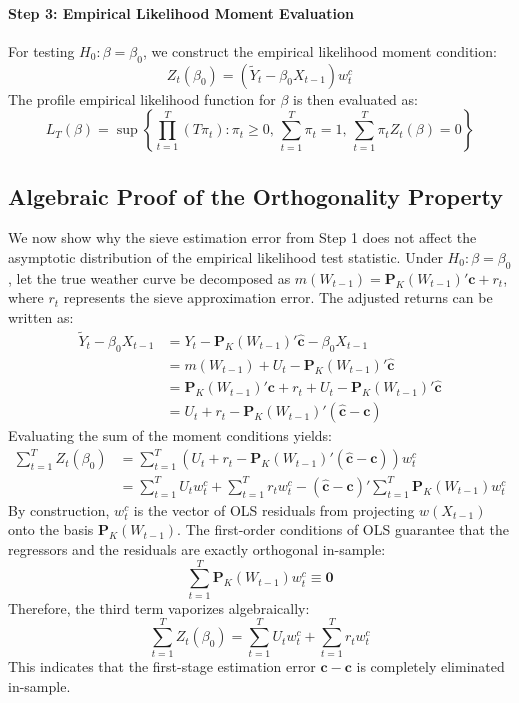 \documentclass{article}
\begin{document}
\paragraph{Step 3: Empirical Likelihood Moment Evaluation}
For testing $H_0: \beta = \beta_0$, we construct the empirical likelihood moment condition:
\begin{equation}
    Z_t(\beta_0) = \left( \widetilde{Y}_t - \beta_0 X_{t-1} \right) w^c_t
\end{equation}
The profile empirical likelihood function for $\beta$ is then evaluated as:
\begin{equation}
    L_T(\beta) = \sup \left\{ \prod_{t=1}^T (T \pi_t) : \pi_t \ge 0, \, \sum_{t=1}^T \pi_t = 1, \, \sum_{t=1}^T \pi_t Z_t(\beta) = 0 \right\}
\end{equation}

\subsection{Algebraic Proof of the Orthogonality Property}

We now show why the sieve estimation error from Step 1 does not affect the asymptotic distribution of the empirical likelihood test statistic. Under $H_0: \beta = \beta_0$, let the true weather curve be decomposed as $m(W_{t-1}) = \bm{P}_K(W_{t-1})'\bm{c} + r_t$, where $r_t$ represents the sieve approximation error. The adjusted returns can be written as:
\begin{align*}
    \widetilde{Y}_t - \beta_0 X_{t-1} &= Y_t - \bm{P}_K(W_{t-1})'\widehat{\bm{c}} - \beta_0 X_{t-1} \\
    &= m(W_{t-1}) + U_t - \bm{P}_K(W_{t-1})'\widehat{\bm{c}} \\
    &= \bm{P}_K(W_{t-1})'\bm{c} + r_t + U_t - \bm{P}_K(W_{t-1})'\widehat{\bm{c}} \\
    &= U_t + r_t - \bm{P}_K(W_{t-1})'\left(\widehat{\bm{c}} - \bm{c}\right)
\end{align*}
Evaluating the sum of the moment conditions yields:
\begin{align*}
    \sum_{t=1}^T Z_t(\beta_0) &= \sum_{t=1}^T \left( U_t + r_t - \bm{P}_K(W_{t-1})'\left(\widehat{\bm{c}} - \bm{c}\right) \right) w^c_t \\
    &= \sum_{t=1}^T U_t w^c_t + \sum_{t=1}^T r_t w^c_t - \left(\widehat{\bm{c}} - \bm{c}\right)' \sum_{t=1}^T \bm{P}_K(W_{t-1}) w^c_t
\end{align*}
By construction, $w^c_t$ is the vector of OLS residuals from projecting $w(X_{t-1})$ onto the basis $\bm{P}_K(W_{t-1})$. The first-order conditions of OLS guarantee that the regressors and the residuals are exactly orthogonal in-sample:
\begin{equation}
    \sum_{t=1}^T \bm{P}_K(W_{t-1}) w^c_t \equiv \bm{0}
\end{equation}
Therefore, the third term vaporizes algebraically:
\begin{equation}
    \sum_{t=1}^T Z_t(\beta_0) = \sum_{t=1}^T U_t w^c_t + \sum_{t=1}^T r_t w^c_t
\end{equation}
This indicates that the first-stage estimation error $\widehat{\bm{c}} - \bm{c}$ is completely eliminated in-sample.
\end{document}
